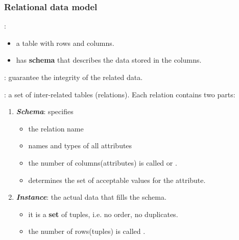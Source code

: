 \documentclass{ainote}
\begin{document}
\subsubsection{Relational data model}
:
\begin{itemize}
    \item a table with rows and columns.
    \item has \textbf{schema} that describes the data stored in the columns.
\end{itemize}
: guarantee the integrity of the related data.

: a set of inter-related tables (relations). Each relation contains two parts:
\begin{enumerate}
    \item \textbf{\textit{Schema}}: specifies
        \begin{itemize}
            \item the relation name
            \item names and types of all attributes
            \item the number of columns(attributes) is called  or .
            \item {} determines the set of acceptable values for the attribute.
        \end{itemize}
    \item \textbf{\textit{Instance}}: the actual data that fills the schema.
        \begin{itemize}
            \item it is a \textbf{set} of tuples, i.e. no order, no duplicates.
            \item the number of rows(tuples) is called .
        \end{itemize}
\end{enumerate}
\end{document}
